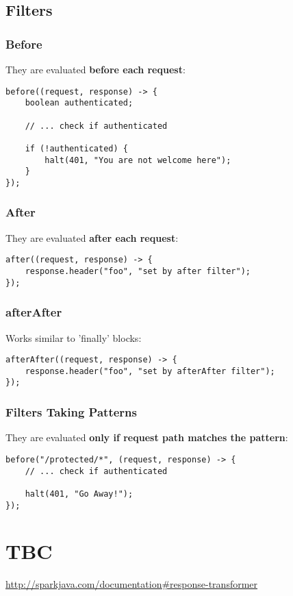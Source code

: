 \documentclass{report}
\begin{document}
\chapter{Filters}


\section{Before}
They are evaluated \textbf{before each request}:
\begin{verbatim}
before((request, response) -> {
    boolean authenticated;

    // ... check if authenticated

    if (!authenticated) {
        halt(401, "You are not welcome here");
    }
});
\end{verbatim}

\section{After}
They are evaluated \textbf{after each request}:
\begin{verbatim}
after((request, response) -> {
    response.header("foo", "set by after filter");
});
\end{verbatim}


\section{afterAfter}
Works similar to 'finally' blocks:
\begin{verbatim}
afterAfter((request, response) -> {
    response.header("foo", "set by afterAfter filter");
});
\end{verbatim}


\section{Filters Taking Patterns}
They are evaluated \textbf{only if request path matches the pattern}:
\begin{verbatim}
before("/protected/*", (request, response) -> {
    // ... check if authenticated

    halt(401, "Go Away!");
});
\end{verbatim}




\part{TBC}
\url{http://sparkjava.com/documentation#response-transformer}
\end{document}
